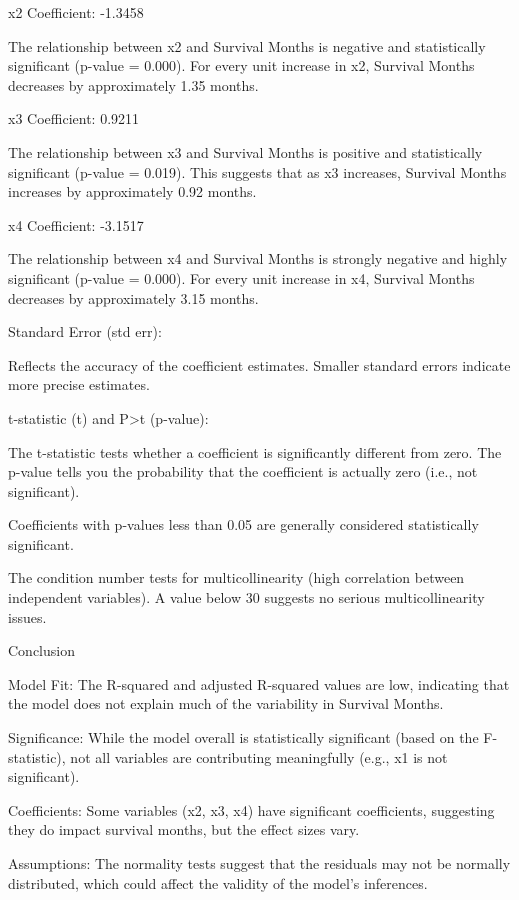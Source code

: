 \documentclass[11pt]{article}
\begin{document}
x2 Coefficient: -1.3458

The relationship between x2 and Survival Months is negative and
statistically significant (p-value = 0.000). For every unit increase in
x2, Survival Months decreases by approximately 1.35 months.

x3 Coefficient: 0.9211

The relationship between x3 and Survival Months is positive and
statistically significant (p-value = 0.019). This suggests that as x3
increases, Survival Months increases by approximately 0.92 months.

x4 Coefficient: -3.1517

The relationship between x4 and Survival Months is strongly negative and
highly significant (p-value = 0.000). For every unit increase in x4,
Survival Months decreases by approximately 3.15 months.

Standard Error (std err):

Reflects the accuracy of the coefficient estimates. Smaller standard
errors indicate more precise estimates.

t-statistic (t) and P\textgreater\textbar t\textbar{} (p-value):

The t-statistic tests whether a coefficient is significantly different
from zero. The p-value tells you the probability that the coefficient is
actually zero (i.e., not significant).

Coefficients with p-values less than 0.05 are generally considered
statistically significant.

The condition number tests for multicollinearity (high correlation
between independent variables). A value below 30 suggests no serious
multicollinearity issues.

Conclusion

Model Fit: The R-squared and adjusted R-squared values are low,
indicating that the model does not explain much of the variability in
Survival Months.

Significance: While the model overall is statistically significant
(based on the F-statistic), not all variables are contributing
meaningfully (e.g., x1 is not significant).

Coefficients: Some variables (x2, x3, x4) have significant coefficients,
suggesting they do impact survival months, but the effect sizes vary.

Assumptions: The normality tests suggest that the residuals may not be
normally distributed, which could affect the validity of the model's
inferences.
\end{document}
